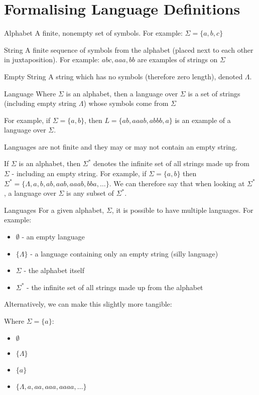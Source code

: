 \section{Formalising Language Definitions}
\begin{define}
\item[Alphabet] A finite, nonempty set of symbols. For example: $\Sigma = \{a, b, c\}$
\item[String] A finite sequence of symbols from the alphabet (placed next to each other in juxtaposition). For example: $abc, aaa, bb$ are examples of strings on $\Sigma$
\item[Empty String] A string which has no symbols (therefore zero length), denoted $\Lambda$. 
\item[Language] Where $\Sigma$ is an alphabet, then a language over $\Sigma$ is a set of strings (including empty string $\Lambda$) whose symbols come from $\Sigma$ 
\end{define}

For example, if $\Sigma = \{a, b\}$, then $L = \{ab, aaab, abbb, a\}$ is an example of a language over $\Sigma$. 

Languages are not finite and they may or may not contain an empty string. 

If $\Sigma$ is an alphabet, then $\Sigma^*$ denotes the infinite set of all strings made up from $\Sigma$ - including an empty string. For example, if $\Sigma = \{a, b\}$ then $\Sigma^* = \{\Lambda, a, b, ab, aab, aaab, bba, \ldots\}$. We can therefore say that when looking at $\Sigma^*$, a language over $\Sigma$ is any subset of $\Sigma^*$. 

\begin{example}{Languages}
For a given alphabet, $\Sigma$, it is possible to have multiple languages. For example:
\begin{itemize}
    \item $\emptyset$ - an empty language
    \item $\{\Lambda\}$ - a language containing only an empty string (silly language)
    \item $\Sigma$ - the alphabet itself
    \item $\Sigma^*$ - the infinite set of all strings made up from the alphabet
\end{itemize}

Alternatively, we can make this slightly more tangible:

Where $\Sigma = \{a\}$:
\begin{itemize}
    \item $\emptyset$
    \item $\{\Lambda\}$
    \item $\{a\}$
    \item $\{\Lambda, a, aa, aaa, aaaa, \ldots\}$
\end{itemize}

\end{example}

